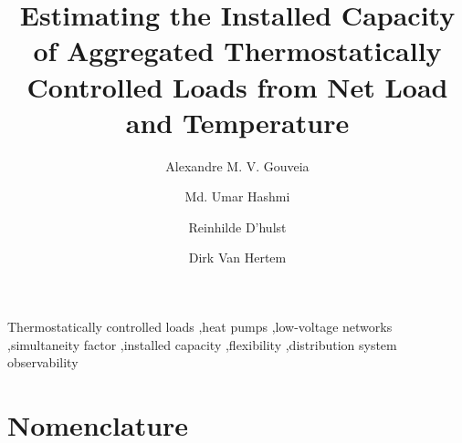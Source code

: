 \documentclass[5p,times,twocolumn]{elsarticle}
\begin{document}
\begin{frontmatter}

\title{Estimating the Installed Capacity of Aggregated Thermostatically Controlled Loads from Net Load and Temperature}

\author[esat,ev,vito]{Alexandre M. V. Gouveia}
\author[esat,ev]{Md. Umar Hashmi}
\author[ev,vito,orion]{Reinhilde D'hulst}
\author[esat,ev]{Dirk Van Hertem}

\begin{abstract}

\end{abstract}

\begin{highlights}

\end{highlights}

\begin{keyword}
Thermostatically controlled loads \sep heat pumps \sep low-voltage networks \sep simultaneity factor \sep installed capacity \sep flexibility \sep distribution system observability
\end{keyword}

\end{frontmatter}

\section*{Nomenclature}
\newcommand{\nomentry}[2]{\item[#1] #2}
\begin{list}{}{\setlength{\labelwidth}{2.6cm}\setlength{\leftmargin}{2.8cm}\setlength{\labelsep}{0.2cm}%
  \setlength{\itemsep}{0pt}\setlength{\parsep}{0pt}\renewcommand{\makelabel}[1]{#1\hfil}}

\end{list}



\end{document}
